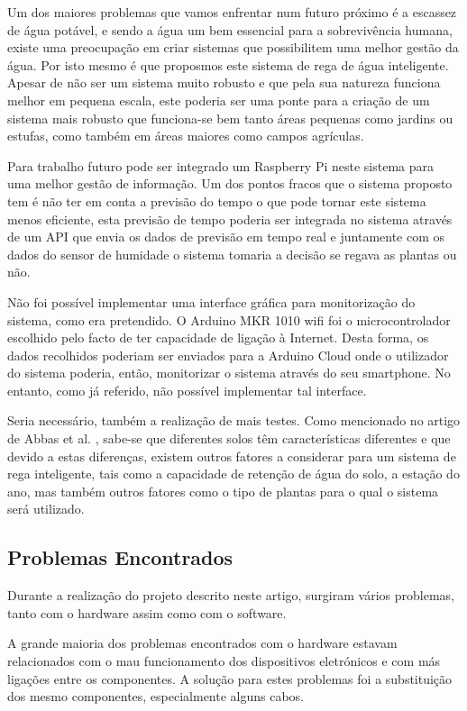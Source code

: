 \documentclass[conference]{IEEEtran}
\begin{document}
Um dos maiores problemas que vamos enfrentar num futuro próximo é a escassez de água potável,
e sendo a água um bem essencial para a sobrevivência humana, existe uma preocupação 
em criar sistemas que possibilitem uma melhor gestão da água. Por isto mesmo 
é que proposmos este sistema de rega de água inteligente. Apesar de não ser um 
sistema muito robusto e que pela sua natureza funciona melhor em pequena escala, este 
poderia ser uma ponte para a criação de um sistema mais robusto que funciona-se bem 
tanto áreas pequenas como jardins ou estufas, como também em áreas maiores como campos agrículas.

Para trabalho futuro pode ser integrado um Raspberry Pi neste sistema para uma melhor 
gestão de informação. Um dos pontos fracos que o sistema proposto tem é não 
ter em conta a previsão do tempo o que pode tornar este sistema menos eficiente, 
esta previsão de tempo poderia ser integrada no sistema através de um API que 
envia os dados de previsão em tempo real e juntamente com os dados do sensor de 
humidade o sistema tomaria a decisão se regava as plantas ou não.

Não foi possível implementar uma interface gráfica para monitorização do sistema, como era pretendido. 
O Arduino MKR 1010 wifi foi o microcontrolador escolhido pelo facto de ter capacidade de ligação à Internet. 
Desta forma, os dados recolhidos poderiam ser enviados para a Arduino Cloud onde o utilizador do sistema poderia, 
então, monitorizar o sistema através do seu smartphone. No entanto, como já referido, não possível 
implementar tal interface.

Seria necessário, também a realização de mais testes. Como mencionado no artigo de Abbas et al. \cite{abbas2014smart}, 
sabe-se que diferentes solos têm características diferentes e que devido a estas diferenças, existem outros 
fatores a considerar para um sistema de rega inteligente, tais como a capacidade de retenção de água do solo, 
a estação do ano, mas também outros fatores como o tipo de plantas para o qual o sistema será utilizado.

\subsection{Problemas Encontrados}

Durante a realização do projeto descrito neste artigo, surgiram vários problemas, tanto com o hardware 
assim como com o software.

A grande maioria dos problemas encontrados com o hardware estavam relacionados com o mau funcionamento dos 
dispositivos eletrónicos e com más ligações entre os componentes. A solução para estes problemas foi a 
substituição dos mesmo componentes, especialmente alguns cabos.
\end{document}

